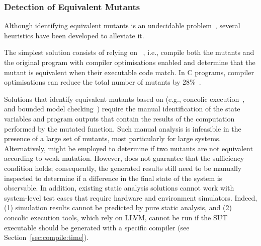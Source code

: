 \subsubsection{Detection of Equivalent Mutants}
\label{sec:background:equivalent}

Although identifying equivalent mutants is an undecidable problem~\cite{madeyski2013overcoming,Bugg:Correctness:82}, several heuristics have been developed to alleviate it.

The simplest solution consists of relying on ~\cite{papadakis2015trivial, kintis2017detecting,papadakis2019mutation}, i.e., compile both the mutants and the original program with compiler optimisations enabled and determine that the mutant is equivalent when their executable code match. In C programs, compiler optimisations can reduce the total number of mutants by 28\%~\cite{kintis2017detecting}.



Solutions that identify equivalent mutants based on  (e.g., concolic execution~\cite{holling2016nequivack}, and bounded model checking~\cite{riener2011test}) require the manual identification of the state variables and program outputs that contain the results of the computation performed by the mutated function.
Such manual analysis is infeasible in the presence of a large set of mutants, most particularly for large systems.
Alternatively,  might be employed to determine if two mutants are not equivalent according to weak mutation.
However,  does not guarantee that the sufficiency condition holds; consequently, the generated results still need to be manually inspected to determine if a difference in the final state of the system is observable. In addition, existing static analysis solutions cannot work with system-level test cases that require hardware and environment simulators.
Indeed, (1) simulation results cannot be predicted by pure static analysis, and (2) concolic execution tools, which rely on LLVM, cannot be run if the SUT executable should be generated with a specific compiler (see Section~\ref{sec:compile:time}).

